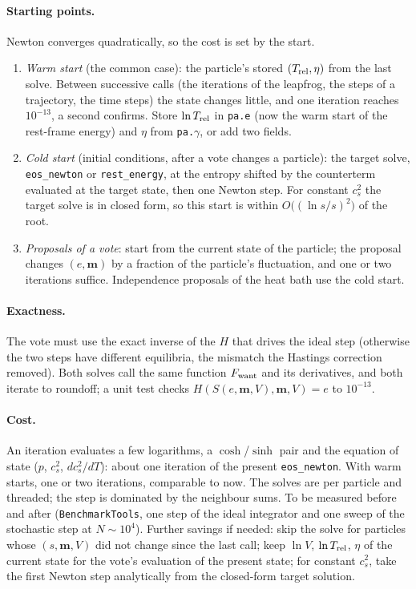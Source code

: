 \documentclass[11pt,aps,preprint,nofootinbib,superscriptaddress,tightenlines]{revtex4-2}
\let\oldparagraph\paragraph
\renewcommand{\paragraph}{\par\bigskip\oldparagraph}
\begin{document}
\paragraph{Starting points.}  Newton converges quadratically, so the cost is set by the start.
\begin{enumerate}
\item \emph{Warm start} (the common case): the particle's stored $(T_{\rm rel},\eta)$ from the last solve.  Between successive calls (the iterations of the leapfrog,
  the steps of a trajectory, the time steps) the state changes little, and one iteration reaches $10^{-13}$, a second confirms.  Store $\ln T_{\rm rel}$ in \texttt{pa.e}
  (now the warm start of the rest-frame energy) and $\eta$ from \texttt{pa.}$\gamma$, or add two fields.
\item \emph{Cold start} (initial conditions, after a vote changes a particle): the target solve, \texttt{eos\_newton} or \texttt{rest\_energy}, at the entropy shifted by
  the counterterm evaluated at the target state, then one Newton step.  For constant $c_s^2$ the target solve is in closed form, so this start is within
  $O\big((\ln s/s)^2\big)$ of the root.
\item \emph{Proposals of a vote}: start from the current state of the particle; the proposal changes $(e,\bm m)$ by a fraction of the particle's fluctuation, and one
  or two iterations suffice.  Independence proposals of the heat bath use the cold start.
\end{enumerate}

\paragraph{Exactness.}  The vote must use the exact inverse of the $H$ that drives the ideal step (otherwise the two steps have different equilibria, the
mismatch the Hastings correction removed).  Both solves call the same function $F_{\rm want}$ and its derivatives, and both iterate to roundoff; a unit test
checks $H(S(e,\bm m,V),\bm m,V)=e$ to $10^{-13}$.

\paragraph{Cost.}  An iteration evaluates a few logarithms, a $\cosh$/$\sinh$ pair and the equation of state ($p$, $c_s^2$, $dc_s^2/dT$): about one iteration of the
present \texttt{eos\_newton}.  With warm starts, one or two iterations, comparable to now.  The solves are per particle and threaded; the step is dominated by the
neighbour sums.  To be measured before and after (\texttt{BenchmarkTools}, one step of the ideal integrator and one sweep of the stochastic step at $N\sim10^4$).
Further savings if needed: skip the solve for particles whose $(s,\bm m,V)$ did not change since the last call; keep $\ln V$, $\ln T_{\rm rel}$, $\eta$ of the current
state for the vote's evaluation of the present state; for constant $c_s^2$, take the first Newton step analytically from the closed-form target solution.
\end{document}
